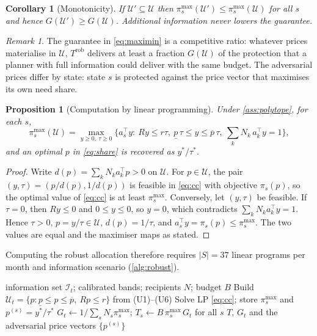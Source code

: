 \documentclass[preprint,12pt,number]{elsarticle}%
\newtheorem{proposition}{Proposition}
\newtheorem{corollary}{Corollary}
\theoremstyle{definition}
\theoremstyle{remark}
\newtheorem{remark}{Remark}
\newcommand{\U}{\mathcal{U}}
\newcommand{\I}{\mathcal{I}}
\newcommand{\pimax}{\pi^{\max}}
\begin{document}
\begin{corollary}[Monotonicity]\label{cor:mono}
If $\U'\subseteq\U$ then $\pimax_s(\U')\le\pimax_s(\U)$ for all $s$ and hence $G(\U')\ge G(\U)$. Additional information never lowers the guarantee.
\end{corollary}

\begin{remark}
The guarantee in \eqref{eq:maximin} is a competitive ratio: whatever prices materialise in $\U$, $T^{\mathrm{rob}}$ delivers at least a fraction $G(\U)$ of the protection that a planner with full information could deliver with the same budget. The adversarial prices differ by state: state $s$ is protected against the price vector that maximises its own need share.
\end{remark}

\begin{proposition}[Computation by linear programming]\label{prop:cc}
Under \cref{ass:polytope}, for each $s$,
\begin{equation}\label{eq:cc}
\pimax_s(\U)=\max_{y\ge0,\ \tau\ge0}\Big\{a_s^{\top}y:\ Ry\le r\tau,\ \underline p\,\tau\le y\le\overline p\,\tau,\ \textstyle\sum_kN_k\,a_k^{\top}y=1\Big\},
\end{equation}
and an optimal $p$ in \eqref{eq:share} is recovered as $y^*/\tau^*$.
\end{proposition}

\begin{proof}
Write $d(p)=\sum_kN_ka_k^{\top}p>0$ on $\U$. For $p\in\U$, the pair $(y,\tau)=(p/d(p),1/d(p))$ is feasible in \eqref{eq:cc} with objective $\pi_s(p)$, so the optimal value of \eqref{eq:cc} is at least $\pimax_s$. Conversely, let $(y,\tau)$ be feasible. If $\tau=0$, then $Ry\le0$ and $0\le y\le 0$, so $y=0$, which contradicts $\sum_kN_ka_k^{\top}y=1$. Hence $\tau>0$, $p=y/\tau\in\U$, $d(p)=1/\tau$, and $a_s^{\top}y=\pi_s(p)\le\pimax_s$. The two values are equal and the maximiser maps as stated.
\end{proof}

Computing the robust allocation therefore requires $|S|=37$ linear programs per month and information scenario (\cref{alg:robust}).

\begin{algorithm}[t]
\caption{Robust allocation in month $t$}\label{alg:robust}
\begin{algorithmic}[1]
\Require information set $\I_t$; calibrated bands; recipients $N$; budget $B$
\State Build $\U_t=\{p:\underline p\le p\le\overline p,\ Rp\le r\}$ from (U1)--(U6)
  \State Solve LP \eqref{eq:cc}; store $\pimax_s$ and $p^{(s)}=y^*/\tau^*$
\EndFor
\State $G_t\gets 1/\sum_sN_s\pimax_s$; \quad $T_s\gets B\,\pimax_s\,G_t$ for all $s$
\State \Return $T$, $G_t$ and the adversarial price vectors $\{p^{(s)}\}$
\end{algorithmic}
\end{algorithm}
\end{document}
